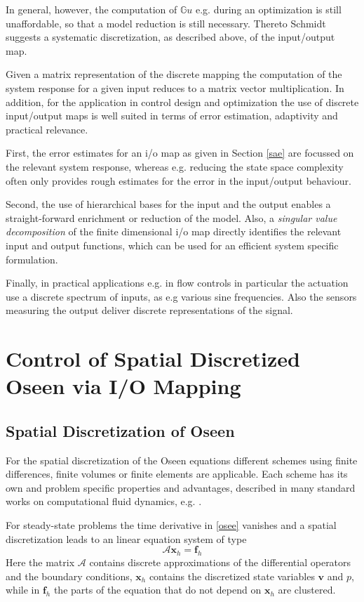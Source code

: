\documentclass[a4paper,10pt,BCOR=15mm]{scrbook}
\begin{document}
In general, however, the computation of $\mathbb G u$ e.g. during an optimization is still unaffordable, so that a model reduction is still necessary. Thereto Schmidt \cite{schm} suggests a systematic discretization, as described above, of the input/output map.

Given a matrix representation of the discrete mapping the computation of the system response for a given input reduces to a matrix vector multiplication. In addition, for the application in control design and optimization the use of discrete input/output maps is well suited in terms of error estimation, adaptivity and practical relevance.

First, the error estimates for an i/o map as given in Section \ref{sae} are focussed on the relevant system response, whereas e.g. reducing the state space complexity often only provides rough estimates for the error in the input/output behaviour.

Second, the use of hierarchical bases for the input and the output enables a straight-forward enrichment or reduction of the model. Also, a \textit{singular value decomposition} of the finite dimensional i/o map directly identifies the relevant input and output functions, which can be used for an efficient system specific formulation.

Finally, in practical applications e.g. in flow controls in particular the actuation use a discrete spectrum of inputs, as e.g various sine frequencies. Also the sensors measuring the output deliver discrete representations of the signal. 

\chapter[Control of Semidiscretized Oseen]{Control of Spatial Discretized Oseen via I/O Mapping}

\section{Spatial Discretization of Oseen}
For the spatial discretization of the Oseen equations different schemes using finite differences, finite volumes or finite elements are applicable. Each scheme has its own and problem specific properties and advantages, described in many standard works on computational fluid dynamics, e.g. \cite{ferz,wend,wess}.  

For steady-state problems the time derivative in \eqref{osee} vanishes and a spatial discretization leads to an linear equation system of type
\begin{equation}\label{stli}
 \mathcal A \mathbf x_h = \mathbf f_h
\end{equation}
Here the matrix $\mathcal A$ contains discrete approximations of the differential operators and the boundary conditions, $\mathbf x_h$ contains the discretized state variables $\mathbf v$ and $p$, while in $\mathbf f_h$ the parts of the equation that do not depend on $\mathbf x_h$ are clustered. 
\end{document}

